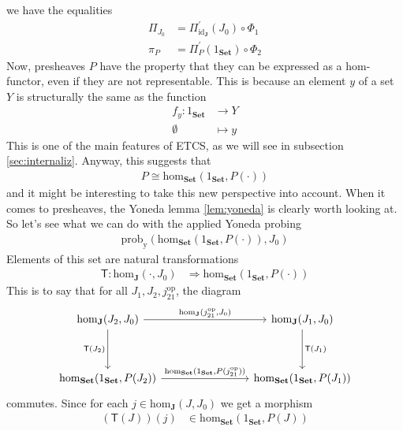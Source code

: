 we have the equalities
\begin{align*}
  \Pi_{J_{0}}
  &=
  \Pi_{\mathrm{id}_{\mathbf{J}}}^{\prime}(J_{0})
  \circ
  \Phi_{1}
  \\
  \pi_{P}
  &=
  \Pi_{P}^{\prime}(1_{\mathbf{Set}})
  \circ
  \Phi_{2}
\end{align*}
Now, presheaves $P$ have the property that they can be expressed as a hom-functor, even if they are not representable.
This is because an element $y$ of a set $Y$ is structurally the same as the function
\begin{align*}
  f_{y}
  \colon
  1_{\mathbf{Set}}
  &\rightarrow
  Y
  \\
  \emptyset
  &\mapsto
  y
\end{align*}
This is one of the main features of ETCS, as we will see in subsection \ref{sec:internaliz}.
Anyway, this suggests that
\begin{align*}
  P
  \cong
  \mathrm{hom}_{\mathbf{Set}}(1_{\mathbf{Set}},P(\cdot))
\end{align*}
and it might be interesting to take this new perspective into account.
When it comes to presheaves, the Yoneda lemma \ref{lem:yoneda} is clearly worth looking at.
So let's see what we can do with the applied Yoneda probing
\begin{align*}
  \mathrm{prob}_{\mathrm{y}}
  \left(
    \mathrm{hom}_{\mathbf{Set}}(1_{\mathbf{Set}},P(\cdot)),
    J_{0}
  \right)
\end{align*}
Elements of this set are natural transformations
\begin{align*}
  \mathsf{T}
  \colon
  \mathrm{hom}_{\mathbf{J}}(\cdot,J_{0})
  &\Rightarrow
  \mathrm{hom}_{\mathbf{Set}}(1_{\mathbf{Set}},P(\cdot))
\end{align*}
This is to say that for all $J_{1},J_{2},j_{21}^{\textrm{op}}$, the diagram
\[
\begin{tikzcd}[row sep=huge, column sep=8em]
  \mathrm{hom}_{\mathbf{J}}(J_{2},J_{0})
  \arrow{r}{\mathrm{hom}_{\mathbf{J}}(j_{21}^{\textrm{op}},J_{0})}
  \arrow[swap]{d}{\mathsf{T}(J_{2})}
  &
  \mathrm{hom}_{\mathbf{J}}(J_{1},J_{0})
  \arrow{d}{\mathsf{T}(J_{1})}
  \\
  \mathrm{hom}_{\mathbf{Set}}(1_{\mathbf{Set}},P(J_{2}))
  \arrow{r}{\mathrm{hom}_{\mathbf{Set}}(1_{\mathbf{Set}},P(j_{21}^{\textrm{op}}))}
  &
  \mathrm{hom}_{\mathbf{Set}}(1_{\mathbf{Set}},P(J_{1}))
\end{tikzcd}
\]
commutes.
Since for each $j \in \mathrm{hom}_{\mathbf{J}}(J,J_{0})$ we get a morphism
\begin{align*}
  (\mathsf{T}(J))(j)
  &\in
  \mathrm{hom}_{\mathbf{Set}}(1_{\mathbf{Set}},P(J))
\end{align*}
